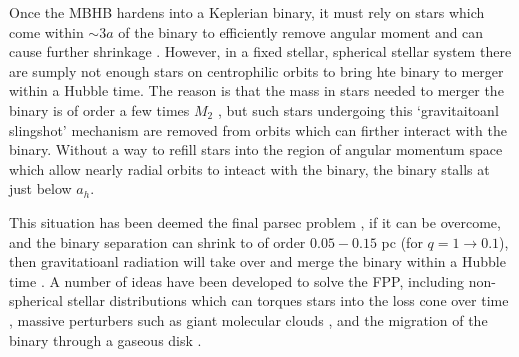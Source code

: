 Once the MBHB hardens into a Keplerian binary, it must rely on stars which
come within $\sim3a$ of the binary to efficiently remove angular moment and
can cause further shrinkage \citep{Saslaw+2005}. However, in a fixed stellar,
spherical stellar system there are sumply not enough stars on centrophilic
orbits to bring hte binary to merger within a Hubble time. The reason is that
the mass in stars needed to merger the binary is of order a few times $M_2$
\citep{MerrittMilos:2005}, but such stars undergoing this `gravitaitoanl
slingshot' mechanism are removed from orbits which can firther interact with
the binary. Without a way to refill stars into the region of angular momentum
space which allow nearly radial orbits to inteact with the binary, the binary
stalls at just below $a_h$.

This situation has been deemed the final parsec problem
\citep[FPP][]{MilosPhinney:2001}, if it can be overcome, and the binary
separation can shrink to of order $0.05-0.15$ pc (for $q=1 \rightarrow 0.1$),
then gravitatioanl radiation will take over and merge the binary within a
Hubble time \citep{Peters:64}. A number of ideas have been developed to solve
the FPP, including non-spherical stellar distributions which can torques stars
into the loss cone over time \citep{triaxialFPPsolns}, massive perturbers such
as giant molecular clouds \citep{massivpertFPPsolns}, and the migration of the
binary through a gaseous disk \citep{GoldRix:2000, ArmitageNatarajan:2002}.

